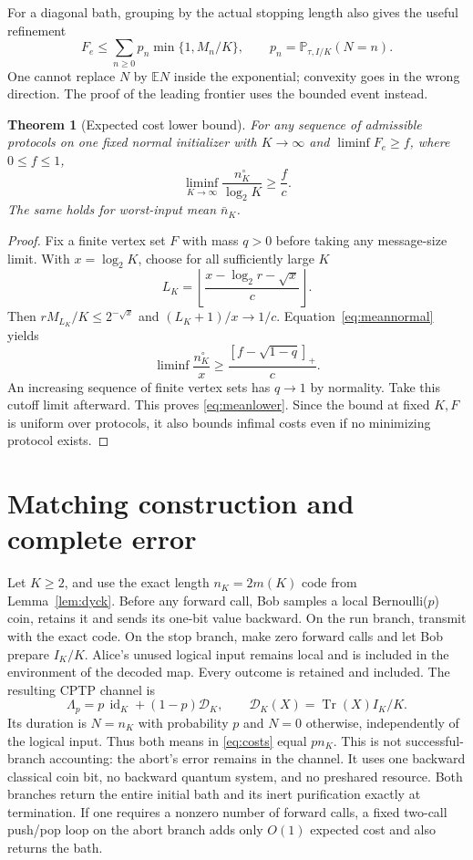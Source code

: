 \documentclass[11pt]{article}
\newtheorem{theorem}{Theorem}[section]
\newcommand{\Tr}{\operatorname{Tr}}
\newcommand{\id}{\operatorname{id}}
\newcommand{\cD}{\mathcal D}
\newcommand{\E}{\mathbb E}
\newcommand{\Prob}{\mathbb P}
\begin{document}
For a diagonal bath, grouping by the actual stopping length also gives the useful refinement
\begin{equation}
 F_e\le\sum_{n\ge0}p_n\min\{1,M_n/K\},\qquad
 p_n=\Prob_{\tau,I/K}(N=n).\label{eq:mixturelengths}
\end{equation}
One cannot replace $N$ by $\E N$ inside the exponential; convexity goes in the wrong direction. The proof of the leading frontier uses the bounded event instead.

\begin{theorem}[Expected cost lower bound]\label{thm:meanlower}
For any sequence of admissible protocols on one fixed normal initializer with $K\to\infty$ and $\liminf F_e\ge f$, where $0\le f\le1$,
\begin{equation}
 \liminf_{K\to\infty}\frac{n_K^\circ}{\log_2K}\ge\frac f c.
 \label{eq:meanlower}
\end{equation}
The same holds for worst-input mean $\bar n_K$.
\end{theorem}
\begin{proof}
Fix a finite vertex set $F$ with mass $q>0$ before taking any message-size limit. With $x=\log_2K$, choose for all sufficiently large $K$
\[
 L_K=\left\lfloor\frac{x-\log_2r-\sqrt{x}}{c}\right\rfloor.
\]
Then $rM_{L_K}/K\le2^{-\sqrt x}$ and $(L_K+1)/x\to1/c$. Equation~\eqref{eq:meannormal} yields
\[
 \liminf\frac{n_K^\circ}{x}\ge\frac{[f-\sqrt{1-q}]_+}{c}.
\]
An increasing sequence of finite vertex sets has $q\to1$ by normality. Take this cutoff limit afterward. This proves \eqref{eq:meanlower}. Since the bound at fixed $K,F$ is uniform over protocols, it also bounds infimal costs even if no minimizing protocol exists.
\end{proof}

\section{Matching construction and complete error}\label{sec:lottery}

Let $K\ge2$, and use the exact length $n_K=2m(K)$ code from Lemma~\ref{lem:dyck}. Before any forward call, Bob samples a local Bernoulli($p$) coin, retains it and sends its one-bit value backward. On the run branch, transmit with the exact code. On the stop branch, make zero forward calls and let Bob prepare $I_K/K$. Alice's unused logical input remains local and is included in the environment of the decoded map. Every outcome is retained and included. The resulting CPTP channel is
\begin{equation}
 \Lambda_p=p\,\id_K+(1-p)\cD_K,\qquad
 \cD_K(X)=\Tr(X)I_K/K.\label{eq:lottery}
\end{equation}
Its duration is $N=n_K$ with probability $p$ and $N=0$ otherwise, independently of the logical input. Thus both means in \eqref{eq:costs} equal $pn_K$. This is not successful-branch accounting: the abort's error remains in the channel. It uses one backward classical coin bit, no backward quantum system, and no preshared resource. Both branches return the entire initial bath and its inert purification exactly at termination. If one requires a nonzero number of forward calls, a fixed two-call push/pop loop on the abort branch adds only $O(1)$ expected cost and also returns the bath.
\end{document}
